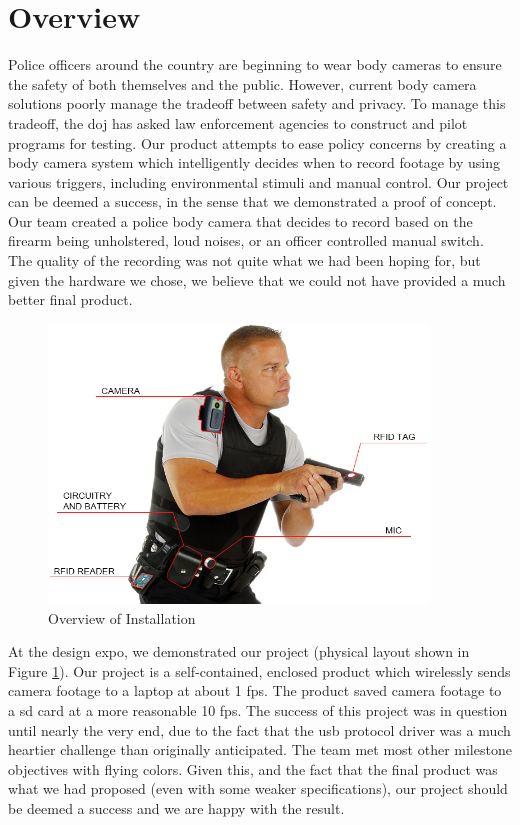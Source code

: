 \documentclass[12pt]{article}
\begin{document}
\section{Overview}
Police officers around the country are beginning to wear body cameras to ensure
the safety of both themselves and the public. However, current body camera
solutions poorly manage the tradeoff between safety and privacy. To manage this
tradeoff, the \gls{doj} has asked law enforcement agencies to construct and
pilot programs for testing\cite{officer_privacy}.  Our product attempts to ease
policy concerns by creating a body camera system which intelligently decides
when to record footage by using various triggers, including environmental
stimuli and manual control.  Our project can be deemed a success, in the sense
that we demonstrated a proof of concept. Our team created a police body camera
that decides to record based on the firearm being unholstered, loud noises, or
an officer controlled manual switch.  The quality of the recording was not
quite what we had been hoping for, but given the hardware we chose, we believe
that we could not have provided a much better final product. 

\begin{figure}[h]
    \centering
    \includegraphics[width=0.9\textwidth]{installation}
    \caption{Overview of Installation}
    \label{fig:installation}
\end{figure}

At the design expo, we demonstrated our project (physical layout shown in
Figure \ref{fig:installation}).  Our project is a self-contained, enclosed
product which wirelessly sends camera footage to a laptop at about 1 \gls{fps}.
The product saved camera footage to a \gls{sd} card at a more reasonable 10
\gls{fps}.  The success of this project was in question until nearly the very
end, due to the fact that the \gls{usb} protocol driver was a much heartier
challenge than originally anticipated. The team met most other milestone
objectives with flying colors. Given this, and the fact that the final product
was what we had proposed (even with some weaker specifications), our project
should be deemed a success and we are happy with the result.
\end{document}
